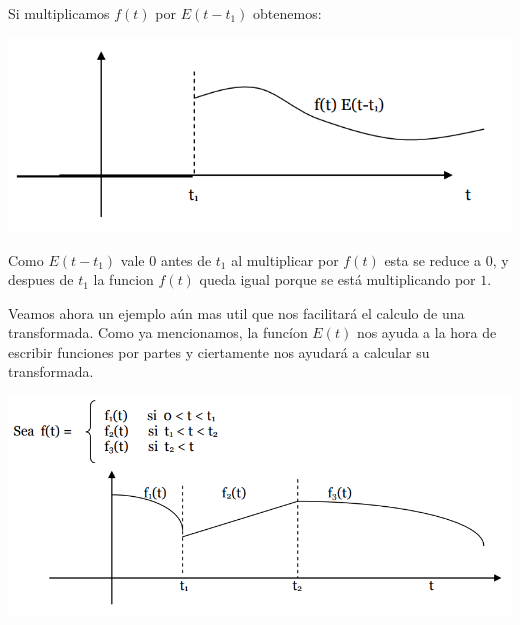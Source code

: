 \documentclass[]{article}
\begin{document}
Si multiplicamos $f(t)$ por $E(t-t_{1})$ obtenemos: 

\includegraphics{../../../Imagenes/Superior/Superior04.PNG}

Como $E(t-t_{1})$ vale $0$ antes de $t_{1}$ al multiplicar por $f(t)$ esta se reduce a $0$, y despues de $t_{1}$ la funcion $f(t)$ queda igual porque se está multiplicando por $1$.

Veamos ahora un ejemplo aún mas util que nos facilitará el calculo de una transformada. Como ya mencionamos, la funcíon $E(t)$ nos ayuda a la hora de escribir funciones por partes y ciertamente nos ayudará a calcular su transformada.

\includegraphics{../../../Imagenes/Superior/Superior05.PNG}
\end{document}
